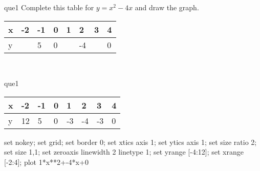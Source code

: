 \documentclass[13.5pt, varwidth=true]{beamer}
\begin{document}
\begin{frame}[shrink=19,fragile]
	\begin{beamercolorbox}[rounded=true, left, shadow=true,wd=14.8cm]{que1}
		 Complete this table for $y = x^{2} - 4x$ and draw the graph. \\[0.3cm] \renewcommand{\arraystretch}{1.2}\begin{tabular}{|C|C|C|C|C|C|C|C|} \hline x & -2 & -1 & 0 & 1 & 2 & 3 & 4 \\ \hline y &  & 5 & 0 &  & -4 &  & 0\\ \hline \end{tabular}\\[0.3cm]
	\end{beamercolorbox}
\end{frame}
\begin{frame}[shrink=19,fragile]
	\begin{beamercolorbox}[rounded=true, left, shadow=true,wd=14.8cm]{que1}
		\renewcommand{\arraystretch}{1.2}\begin{tabular}{|C|C|C|C|C|C|C|C|} \hline x & -2 & -1 & 0 & 1 & 2 & 3 & 4 \\ \hline y & 12 & 5 & 0 & -3 & -4 & -3 & 0\\ \hline \end{tabular}\begin{gnuplot}[terminal=pdf] set nokey; set grid; set border 0; set xtics axis 1; set ytics axis 1; set size ratio 2; set size 1,1; set zeroaxis linewidth 2 linetype 1; set yrange [-4:12]; set xrange [-2:4]; plot 1*x**2+-4*x+0 \end{gnuplot}
	\end{beamercolorbox}
\end{frame}
\end{document}
